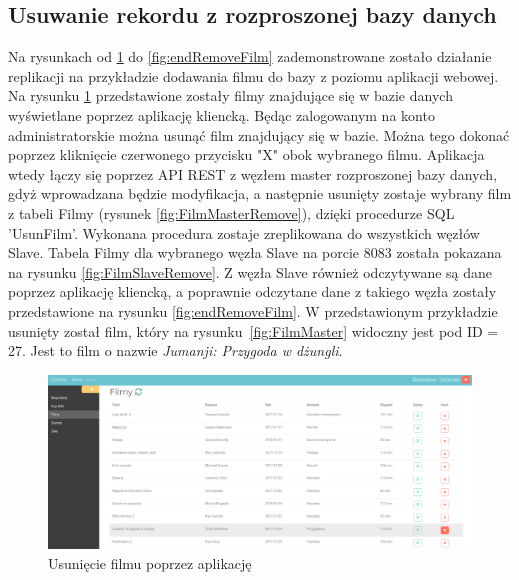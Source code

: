 \subsection{Usuwanie rekordu z rozproszonej bazy danych}

Na rysunkach od \ref{fig:removeFilm} do \ref{fig:endRemoveFilm} zademonstrowane zostało działanie replikacji na przykładzie dodawania filmu do bazy z poziomu aplikacji webowej.\\

Na rysunku \ref{fig:removeFilm} przedstawione zostały filmy znajdujące się w bazie danych wyświetlane poprzez aplikację kliencką. Będąc zalogowanym na konto administratorskie można usunąć film znajdujący się w bazie. Można tego dokonać poprzez kliknięcie czerwonego przycisku "X" obok wybranego filmu. Aplikacja wtedy łączy się poprzez API REST z węzłem master rozproszonej bazy danych, gdyż wprowadzana będzie modyfikacja, a następnie usunięty zostaje wybrany film z tabeli Filmy (rysunek \ref{fig:FilmMasterRemove}), dzięki procedurze SQL 'UsunFilm'. Wykonana procedura zostaje zreplikowana do wszystkich węzłów Slave. Tabela Filmy dla wybranego węzła Slave na porcie 8083 została pokazana na rysunku \ref{fig:FilmSlaveRemove}. Z węzła Slave również odczytywane są dane poprzez aplikację kliencką, a poprawnie odczytane dane z takiego węzła zostały przedstawione na rysunku \ref{fig:endRemoveFilm}. W przedstawionym przykładzie usunięty został film, który na rysunku~\ref{fig:FilmMaster} widoczny jest pod ID = 27. Jest to film o nazwie \textit{Jumanji: Przygoda w dżungli}.

\begin{figure} [H]
	\centering
	\includegraphics[width=1\linewidth]{rozdzial06/r1.png}
	\caption{Usunięcie filmu poprzez aplikację}
	\label{fig:removeFilm}
\end{figure}

